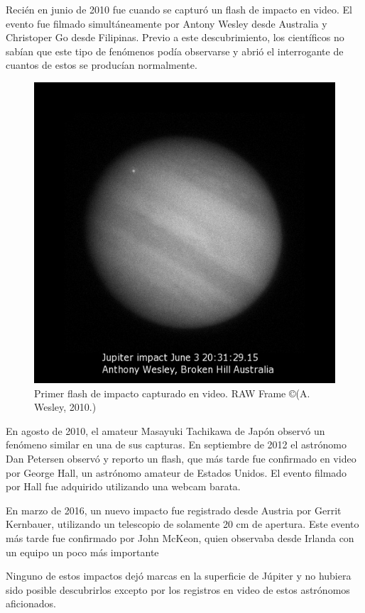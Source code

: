 \documentclass[a4paper,10pt]{article}
\begin{document}
Recién en junio de 2010 fue cuando se capturó un flash de impacto en video\cite{11}. El 
evento fue filmado simultáneamente por Antony Wesley desde Australia y Christoper Go 
desde Filipinas.  Previo a este descubrimiento, los científicos no sabían que este tipo 
de fenómenos podía observarse y abrió el interrogante de cuantos de estos se producían 
normalmente.
\begin{figure}[H]
\centering
\includegraphics[scale=0.45]{wesley-2010.jpg}
\caption{Primer flash de impacto capturado en video. RAW Frame \copyright(A. Wesley, 
2010.)}
\label{amateur-map}
\end{figure}
En agosto de 2010, el amateur Masayuki Tachikawa de Japón observó un fenómeno similar en 
una de sus capturas\cite{12}. En septiembre de 2012 el astrónomo Dan Petersen observó y 
reporto un flash, que más tarde fue confirmado en video por George Hall, un astrónomo 
amateur de Estados Unidos. El evento filmado por Hall fue adquirido utilizando una webcam 
barata\cite{13}.

En marzo de 2016, un nuevo impacto fue registrado desde Austria por Gerrit Kernbauer, 
utilizando un telescopio de solamente 20 cm de apertura. Este evento más tarde fue 
confirmado por John McKeon, quien observaba desde Irlanda con un equipo un poco más 
importante\cite{14}

Ninguno de estos impactos dejó marcas en la superficie de Júpiter y no hubiera 
sido posible descubrirlos excepto por los registros en video de estos astrónomos 
aficionados.
\end{document}
